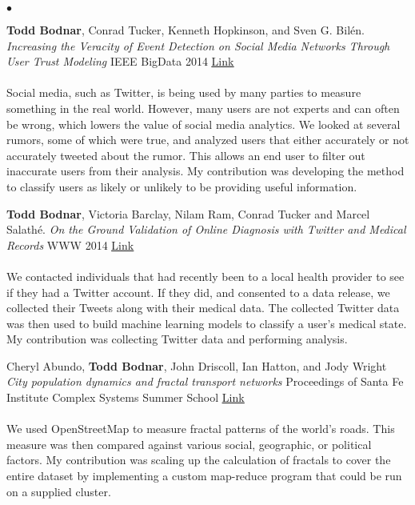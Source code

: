 \documentclass[margin,line]{res}
\newcommand{\linkToUrl}[1]{{\color{blue}\underline{\href{#1}{Link}}}}
\newenvironment{list2}{
  \begin{list}{$\bullet$}{%
      \setlength{\itemsep}{0in}
      \setlength{\parsep}{0in} \setlength{\parskip}{0in}
      \setlength{\topsep}{0in} \setlength{\partopsep}{0in} 
      \setlength{\leftmargin}{10pt}}}{\end{list}}
\begin{document}
\begin{resume}
\begin{list2}
\item \textbf{Todd Bodnar}, Conrad Tucker, Kenneth Hopkinson, and Sven G. Bil\'en. \textit{Increasing the Veracity of Event Detection on Social Media Networks Through User Trust Modeling} IEEE BigData 2014 \linkToUrl{http://bit.ly/18RqYCR}
\hfill \\ \\
Social media, such as Twitter, is being used by many parties to measure something in the real world. However, many users are not experts and can often be wrong, which lowers the value of social media analytics. We looked at several rumors, some of which were true, and analyzed users that either accurately or not accurately tweeted about the rumor. This allows an end user to filter out inaccurate users from their analysis. My contribution was developing the method to classify users as likely or unlikely to be providing useful information. 
\\
\item \textbf{Todd Bodnar}, Victoria Barclay, Nilam Ram, Conrad Tucker and Marcel Salath\'e. \textit{On the Ground Validation of Online Diagnosis with Twitter and Medical Records} WWW 2014 \linkToUrl{http://bit.ly/R82tZp}
\hfill \\ \\
We contacted individuals that had recently been to a local health provider to see if they had a Twitter account. If they did, and consented to a data release, we collected their Tweets along with their medical data. The collected Twitter data was then used to build machine learning models to classify a user's medical state. My contribution was collecting Twitter data and performing analysis.
\\
\item Cheryl Abundo, \textbf{Todd Bodnar}, John Driscoll, Ian Hatton, and Jody Wright
 \textit{City population dynamics and fractal transport networks} Proceedings of Santa Fe Institute Complex Systems Summer School \linkToUrl{bit.ly/19A22vY}
\hfill \\ \\
We used OpenStreetMap to measure fractal patterns of the world's roads. This measure was then compared against various social, geographic, or political factors. My contribution was scaling up the calculation of fractals to cover the entire dataset by implementing a custom map-reduce program that could be run on a supplied cluster.



\end{list2}
\end{resume}
\end{document}
